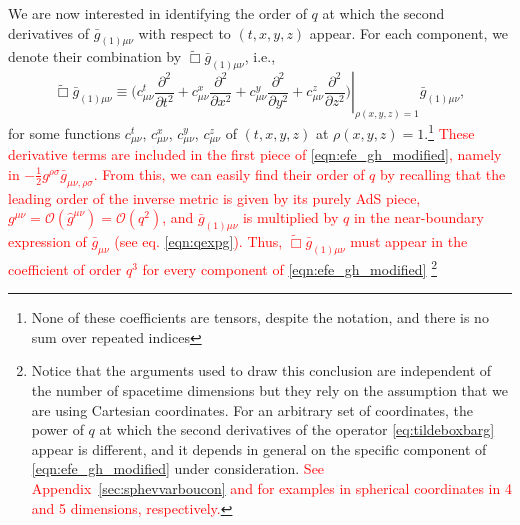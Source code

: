 \documentclass[a4paper,11pt]{article}
\numberwithin{equation}{section}
\begin{document}
We are now interested in identifying the order of $q$ at which the second derivatives of $ \bar{g}_{(1) \mu \nu}$ with respect to $(t,x,y,z)$ 
appear.
For each component, we denote their combination by $\tilde{\Box}\bar{g}_{(1)\mu\nu}$, i.e., 
\begin{equation}
\label{eq:tildeboxbarg}
\tilde{\Box}\bar{g}_{(1)\mu\nu}\equiv\left.\biggl(c^t_{\mu\nu}\frac{\partial^2}{\partial t^2}+c^x_{\mu\nu}\frac{\partial^2}{\partial x^2}+c^y_{\mu\nu}\frac{\partial^2}{\partial y^2}+c^z_{\mu\nu}\frac{\partial^2}{\partial z^2}\biggr)\right |_{\rho(x,y,z)=1}\bar{g}_{(1)\mu\nu},
\end{equation}
for some functions $c^t_{\mu\nu}$, $c^x_{\mu\nu}$, $c^y_{\mu\nu}$, $c^z_{\mu\nu}$ of $(t,x,y,z)$ at $\rho(x,y,z)=1$.\footnote{None of these coefficients are tensors, despite the notation, and there is no sum over repeated indices}
\textcolor{red}{These derivative terms are included in the first piece of \eqref{eqn:efe_gh_modified}, namely in $-\frac{1}{2}g^{\rho \sigma} \bar{g}_{\mu \nu, \rho \sigma}$. From this, we can easily find their order of $q$ by recalling that the leading order of the inverse metric is given by its purely AdS piece, $g^{\mu\nu}=\mathcal{O}(\hat{g}^{\mu\nu})=\mathcal{O}(q^{2})$, and $\bar{g}_{(1)\mu\nu}$ is multiplied by $q$ in the near-boundary expression of $\bar{g}_{\mu\nu}$ (see  eq. \eqref{eqn:qexpg}). Thus, $\tilde{\Box}\bar{g}_{(1)\mu\nu}$ must appear in the coefficient of order $q^{3}$ for every component of \eqref{eqn:efe_gh_modified}}
\footnote{Notice that the arguments used to draw this conclusion are independent of the number of spacetime dimensions but they rely on the assumption that we are using Cartesian coordinates. For an arbitrary set of coordinates, the power of $q$ at which the second derivatives of the operator \eqref{eq:tildeboxbarg} appear is different, and it depends in general on the specific component of \eqref{eqn:efe_gh_modified} under consideration.
\textcolor{red}{See Appendix~\ref{sec:sphevvarboucon} and \cite{Bantilan:2012vu} for examples in spherical coordinates in 4 and 5 dimensions, respectively.}
}
\end{document}

